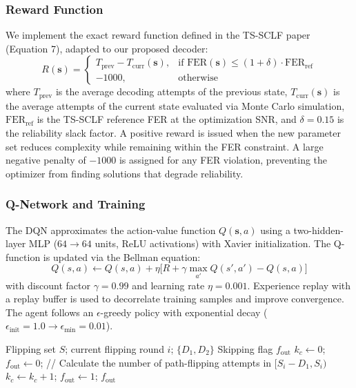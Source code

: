 \documentclass[journal,twocolumn]{IEEEtran}
\begin{document}
\subsubsection{Reward Function}
We implement the exact reward function defined in the TS-SCLF paper~\cite{sun2026} (Equation 7), adapted to our proposed decoder:
\begin{equation}
R(\mathbf{s}) = \begin{cases}
T_{\text{prev}} - T_{\text{curr}}(\mathbf{s}), & \text{if } \mathrm{FER}(\mathbf{s}) \leq (1+\delta)\cdot\mathrm{FER}_{\text{ref}} \\
-1000, & \text{otherwise}
\end{cases}
\label{eq:dqn_reward}
\end{equation}
where $T_{\text{prev}}$ is the average decoding attempts of the previous state, $T_{\text{curr}}(\mathbf{s})$ is the average attempts of the current state evaluated via Monte Carlo simulation, $\mathrm{FER}_{\text{ref}}$ is the TS-SCLF reference FER at the optimization SNR, and $\delta = 0.15$ is the reliability slack factor. A positive reward is issued when the new parameter set reduces complexity while remaining within the FER constraint. A large negative penalty of $-1000$ is assigned for any FER violation, preventing the optimizer from finding solutions that degrade reliability.

\subsubsection{Q-Network and Training}
The DQN approximates the action-value function $Q(\mathbf{s}, a)$ using a two-hidden-layer MLP ($64 \rightarrow 64$ units, ReLU activations) with Xavier initialization. The Q-function is updated via the Bellman equation:
\begin{equation}
Q(s,a) \leftarrow Q(s,a) + \eta \Big[ R + \gamma \max_{a'} Q(s', a') - Q(s,a) \Big]
\end{equation}
with discount factor $\gamma = 0.99$ and learning rate $\eta = 0.001$. Experience replay with a replay buffer is used to decorrelate training samples and improve convergence. The agent follows an $\epsilon$-greedy policy with exponential decay ($\epsilon_{\text{init}} = 1.0 \rightarrow \epsilon_{\text{min}} = 0.01$).

\begin{algorithm}
\caption{FLIPSKIP: Path-Flipping Skip Criterion}
\begin{algorithmic}[1]
\INPUT Flipping set $S$; current flipping round $i$; $\{D_1, D_2\}$
\OUTPUT Skipping flag $f_{\text{out}}$
\STATE $k_c \leftarrow 0$; $f_{\text{out}} \leftarrow 0$;
\STATE // Calculate the number of path-flipping attempts in $[S_i - D_1, S_i)$
\STATE $k_c \leftarrow k_c + 1$;
\ENDIF
\ENDFOR
{}
\STATE $f_{\text{out}} \leftarrow 1$;
\ENDIF
\RETURN $f_{\text{out}}$
\end{algorithmic}
\end{algorithm}
\end{document}
